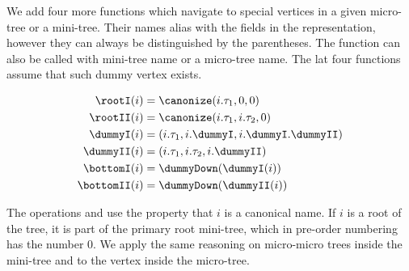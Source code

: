 \begin{algorithm}
\begin{algorithmic}
	 
		 
			\State {}
		\Else {}
			\State {}
		\EndIf
	\Else {}
		\State {}
	\EndIf
\EndFunction
\end{algorithmic}
\end{algorithm}

\begin{algorithm}
\begin{algorithmic}
	 
		\State {}
	\Else
		 
			\State {}
		\Else {}
			\State {}
		\EndIf
	\EndIf
\EndFunction
\end{algorithmic}
\end{algorithm}

We add four more functions which navigate to special vertices in a given micro-tree or a mini-tree.
Their names alias with the fields in the representation, however they can always be distinguished by the parentheses.
The function can also be called with mini-tree name or a micro-tree name.
The lat four functions assume that such dummy vertex exists.

\begin{align*}
	\rootI(i) &= \canonize(i.\tau_1, 0, 0) \\
	\rootII(i) &= \canonize(i.\tau_1, i.\tau_2, 0) \\
	\dummyI(i) &= (i.\tau_1, i.\dummyI, i.\dummyI.\dummyII) \\
	\dummyII(i) &= (i.\tau_1, i.\tau_2, i.\dummyII) \\
	\bottomI(i) &= \dummyDown(\dummyI(i)) \\
	\bottomII(i) &= \dummyDown(\dummyII(i))
\end{align*}

\bigbreak

The operations \isRoot{} and \isLeaf{} use the property that $i$ is a canonical name.
If $i$ is a root of the tree, it is part of the primary root mini-tree, which in pre-order numbering has the number $0$.
We apply the same reasoning on micro-micro trees inside the mini-tree and to the vertex inside the micro-tree.

